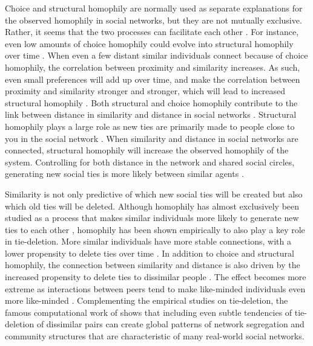 \documentclass[11pt]{article}
\begin{document}
\noindent Choice and structural homophily are normally used as separate explanations for the observed homophily in social networks, but they are not mutually exclusive. Rather, it seems that the two processes can facilitate each other \cite{asikainen_cumulative_2020}. For instance, even low amounts of choice homophily could evolve into structural homophily over time \cite{asikainen_cumulative_2020,kossinets_origins_2009,taylor_exploring_2018}. When even a few distant similar individuals connect because of choice homophily, the correlation between proximity and similarity increases. As such, even small preferences will add up over time, and make the correlation between proximity and similarity stronger and stronger, which will lead to increased structural homophily \cite{kossinets_origins_2009}. 
Both structural and choice homophily contribute to the link between distance in similarity and distance in social networks \cite{bener_empirical_2016}. Structural homophily plays a large role as new ties are primarily made to people close to you in the social network \cite{bianconi_triadic_2014, peixoto_disentangling_2022}. When similarity and distance in social networks are connected, structural homophily will increase the observed homophily of the system. Controlling for both distance in the network and shared social circles, generating new social ties is more likely between similar agents \cite{kossinets_origins_2009, bener_empirical_2016}.

\noindent Similarity is not only predictive of which new social ties will be created but also which old ties will be deleted. Although homophily has almost exclusively been studied as a process that makes similar individuals more likely to generate new ties to each other \cite{noel2011unfriending, bener_empirical_2016}, homophily has been shown empirically to also play a key role in tie-deletion. More similar individuals have more stable connections, with a lower propensity to delete ties over time \cite{noel2011unfriending, bener_empirical_2016, mcpherson_birds_2001, kossinets_origins_2009}.
In addition to choice and structural homophily, the connection between similarity and distance is also driven by the increased propensity to delete ties to dissimilar people \cite{kossinets_origins_2009, bener_empirical_2016}. The effect becomes more extreme as interactions between peers tend to make like-minded individuals even more like-minded \cite{friedkin_social_1990, spears_social_2021}. Complementing the empirical studies on tie-deletion, the famous computational work of  shows that including even subtle tendencies of tie-deletion of dissimilar pairs can create global patterns of network segregation and community structures that are characteristic of many real-world social networks. 
\end{document}

